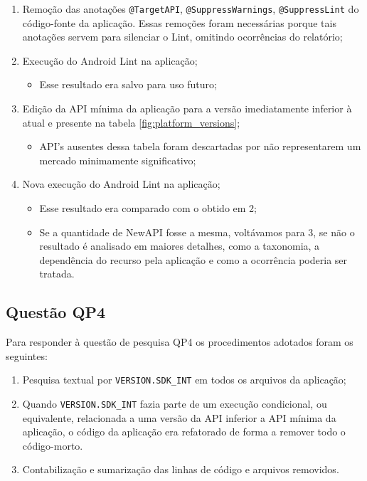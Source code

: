 \begin{enumerate}
	\item Remoção das anotações \texttt{@TargetAPI}, \texttt{@SuppressWarnings},
		 	\texttt{@SuppressLint} do código-fonte da aplicação. Essas remoções foram
		 	 necessárias porque tais anotações servem para silenciar o Lint, omitindo 
		 	 ocorrências do relatório; 
	\item Execução do Android Lint na aplicação;
		\begin{itemize}
			\item Esse resultado era salvo para uso futuro;
		\end{itemize}
	\item Edição da API mínima da aplicação para a versão imediatamente inferior à atual
		e presente na tabela \ref{fig:platform_versions};
		\begin{itemize}
			\item API's ausentes dessa tabela foram descartadas por não representarem
			um mercado minimamente significativo;
		\end{itemize}
	\item Nova execução do Android Lint na aplicação;
		\begin{itemize}
			\item Esse resultado era comparado com o obtido em 2;
			\item Se a quantidade de NewAPI fosse a mesma, voltávamos para 3, se não
			o resultado é analisado em maiores detalhes, como a taxonomia, a dependência
			do recurso pela aplicação e como a ocorrência poderia ser tratada.
		\end{itemize}
\end{enumerate}

\subsection{Questão QP4}
Para responder à questão de pesquisa QP4 os procedimentos adotados foram os seguintes:

\begin{enumerate}
	\item Pesquisa textual por \texttt{VERSION.SDK\_INT} em todos os arquivos da
		aplicação;
	\item Quando \texttt{VERSION.SDK\_INT} fazia parte de um execução condicional, ou equivalente, relacionada a uma versão da API inferior a API mínima da aplicação, o código da aplicação era refatorado de forma a remover todo o código-morto.
	\item Contabilização e sumarização das linhas de código e arquivos removidos.
\end{enumerate}

